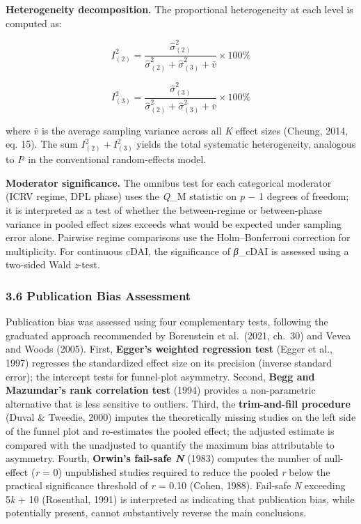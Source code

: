 \documentclass[
  12pt,a4paper]{article}
\begin{document}
\textbf{Heterogeneity decomposition.} The proportional heterogeneity at
each level is computed as:

\[I_{(2)}^{2} = \frac{{\widehat{\sigma}}_{(2)}^{2}}{{\widehat{\sigma}}_{(2)}^{2} + {\widehat{\sigma}}_{(3)}^{2} + \bar{v}} \times 100\%\]

\[I_{(3)}^{2} = \frac{{\widehat{\sigma}}_{(3)}^{2}}{{\widehat{\sigma}}_{(2)}^{2} + {\widehat{\sigma}}_{(3)}^{2} + \bar{v}} \times 100\%\]

where \(\bar{v}\) is the average sampling variance across all \emph{K}
effect sizes (Cheung, 2014, eq. 15). The sum
\(I_{(2)}^{2} + I_{(3)}^{2}\) yields the total systematic heterogeneity,
analogous to \emph{I}² in the conventional random-effects model.

\textbf{Moderator significance.} The omnibus test for each categorical
moderator (ICRV regime, DPL phase) uses the \emph{Q}\_M statistic on
\emph{p} − 1 degrees of freedom; it is interpreted as a test of whether
the between-regime or between-phase variance in pooled effect sizes
exceeds what would be expected under sampling error alone. Pairwise
regime comparisons use the Holm--Bonferroni correction for multiplicity.
For continuous cDAI, the significance of \emph{β}\_cDAI is assessed
using a two-sided Wald \emph{z}-test.

\hypertarget{publication-bias-assessment}{%
\subsubsection{3.6 Publication Bias
Assessment}\label{publication-bias-assessment}}

Publication bias was assessed using four complementary tests, following
the graduated approach recommended by Borenstein et al.~(2021, ch.~30)
and Vevea and Woods (2005). First, \textbf{Egger's weighted regression
test} (Egger et al., 1997) regresses the standardized effect size on its
precision (inverse standard error); the intercept tests for funnel-plot
asymmetry. Second, \textbf{Begg and Mazumdar's rank correlation test}
(1994) provides a non-parametric alternative that is less sensitive to
outliers. Third, the \textbf{trim-and-fill procedure} (Duval \& Tweedie,
2000) imputes the theoretically missing studies on the left side of the
funnel plot and re-estimates the pooled effect; the adjusted estimate is
compared with the unadjusted to quantify the maximum bias attributable
to asymmetry. Fourth, \textbf{Orwin's fail-safe \emph{N}} (1983)
computes the number of null-effect (\emph{r} = 0) unpublished studies
required to reduce the pooled \emph{r} below the practical significance
threshold of \emph{r} = 0.10 (Cohen, 1988). Fail-safe \emph{N} exceeding
5\emph{k} + 10 (Rosenthal, 1991) is interpreted as indicating that
publication bias, while potentially present, cannot substantively
reverse the main conclusions.
\end{document}
